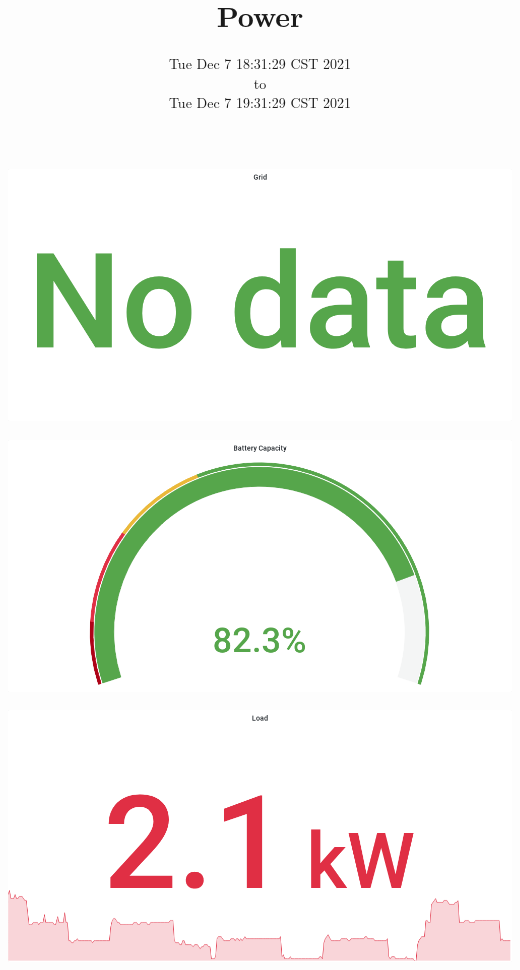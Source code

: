 \documentclass{article}
\begin{document}
\title{Power  }
\date{Tue Dec  7 18:31:29 CST 2021\\to\\Tue Dec  7 19:31:29 CST 2021}
\maketitle
\begin{center}
\par
\vspace{0.5cm}
\includegraphics[width=\textwidth]{image4}
\par
\vspace{0.5cm}
\par
\vspace{0.5cm}
\includegraphics[width=\textwidth]{image2}
\par
\vspace{0.5cm}
\par
\vspace{0.5cm}
\includegraphics[width=\textwidth]{image8}

\end{center}
\end{document}
